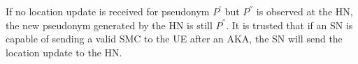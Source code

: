 \documentclass[portrait,a0]{a0poster}
\begin{document}
\begin{multicols}{2}
\noindent
If no location update is received for pseudonym $P^{'}$ but $P^{''}$ is observed at the HN, the new pseudonym generated by the HN is still $P^{''}$. It is trusted that if an SN is capable of sending a valid SMC to the UE after an AKA, the SN will send the location update to the HN.

\normalsize




\end{multicols}

\vfill %

\begin{minipage}[t]{0.9\linewidth} %
\footnotesize
{}
\end{minipage}
\end{document}
